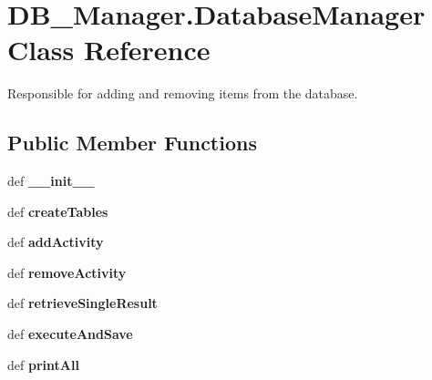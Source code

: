 \hypertarget{classDB__Manager_1_1DatabaseManager}{\section{D\-B\-\_\-\-Manager.\-Database\-Manager Class Reference}
\label{classDB__Manager_1_1DatabaseManager}
}


Responsible for adding and removing items from the database.  


\subsection*{Public Member Functions}
\begin{DoxyCompactItemize}
\item 
\hypertarget{classDB__Manager_1_1DatabaseManager_a85666dbb8f3aa7925fa67d99db814cbf}{def {\bfseries \-\_\-\-\_\-init\-\_\-\-\_\-}}\label{classDB__Manager_1_1DatabaseManager_a85666dbb8f3aa7925fa67d99db814cbf}

\item 
\hypertarget{classDB__Manager_1_1DatabaseManager_ad89246a662dcb824b5f901b6153845a6}{def {\bfseries create\-Tables}}\label{classDB__Manager_1_1DatabaseManager_ad89246a662dcb824b5f901b6153845a6}

\item 
\hypertarget{classDB__Manager_1_1DatabaseManager_a326a1dba61220f889770bcd5241f430c}{def {\bfseries add\-Activity}}\label{classDB__Manager_1_1DatabaseManager_a326a1dba61220f889770bcd5241f430c}

\item 
\hypertarget{classDB__Manager_1_1DatabaseManager_a104922817cbc9420b57b9c2d68ad296a}{def {\bfseries remove\-Activity}}\label{classDB__Manager_1_1DatabaseManager_a104922817cbc9420b57b9c2d68ad296a}

\item 
\hypertarget{classDB__Manager_1_1DatabaseManager_a1df8fdb4dbd87dcedfa3382024689508}{def {\bfseries retrieve\-Single\-Result}}\label{classDB__Manager_1_1DatabaseManager_a1df8fdb4dbd87dcedfa3382024689508}

\item 
\hypertarget{classDB__Manager_1_1DatabaseManager_abc5c71e59aa2a4af2766e2054c35c511}{def {\bfseries execute\-And\-Save}}\label{classDB__Manager_1_1DatabaseManager_abc5c71e59aa2a4af2766e2054c35c511}

\item 
\hypertarget{classDB__Manager_1_1DatabaseManager_a16dd65216c89481a7e45f2d5d1b18b0c}{def {\bfseries print\-All}}\label{classDB__Manager_1_1DatabaseManager_a16dd65216c89481a7e45f2d5d1b18b0c}

\end{DoxyCompactItemize}
